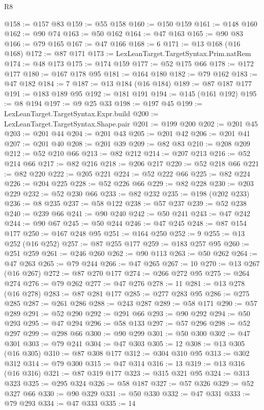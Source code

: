 \begin{lexlean}{R8}
\begin{coremodule}
@158 := @157 @83
@159 := @55 @158
@160 := @150 @159
@161 := @148 @160
@162 := @90 @74
@163 := @50 @162
@164 := @47 @163
@165 := @90 @83
@166 := @79 @165
@167 := @47 @166
@168 := 6
@171 := @13 @168 (@16 @168)
@172 := @87 @171
@173 := LexLeanTarget.TargetSyntax.Prim.natRem
@174 := @48 @173
@175 := @174 @159
@177 := @52 @175 @66
@178 := @172 @177
@180 := @167 @178 @95
@181 := @164 @180
@182 := @79 @162
@183 := @47 @182
@184 := 7
@187 := @13 @184 (@16 @184)
@189 := @87 @187 @177
@191 := @183 @189 @95
@192 := @181 @191
@194 := @145 (@161 @192)
@195 := @8 @194
@197 := @9 @25 @33
@198 := @197 @45
@199 := LexLeanTarget.TargetSyntax.Expr.build
@200 := LexLeanTarget.TargetSyntax.Shape.pair
@201 := @199 @200
@202 := @201 @45
@203 := @201 @44
@204 := @201 @43
@205 := @201 @42
@206 := @201 @41
@207 := @201 @40
@208 := @201 @39
@209 := @82 @83
@210 := @208 @209
@212 := @52 @210 @66
@213 := @82 @212
@214 := @207 @213
@216 := @52 @214 @66
@217 := @82 @216
@218 := @206 @217
@220 := @52 @218 @66
@221 := @82 @220
@222 := @205 @221
@224 := @52 @222 @66
@225 := @82 @224
@226 := @204 @225
@228 := @52 @226 @66
@229 := @82 @228
@230 := @203 @229
@232 := @52 @230 @66
@233 := @82 @232
@235 := @198 (@202 @233)
@236 := @8 @235
@237 := @58 @122
@238 := @57 @237
@239 := @52 @238
@240 := @239 @66
@241 := @90 @240
@242 := @50 @241
@243 := @47 @242
@244 := @90 @67
@245 := @50 @244
@246 := @47 @245
@248 := @87 @154 @177
@250 := @167 @248 @95
@251 := @164 @250
@252 := 9
@255 := @13 @252 (@16 @252)
@257 := @87 @255 @177
@259 := @183 @257 @95
@260 := @251 @259
@261 := @246 @260
@262 := @90 @113
@263 := @50 @262
@264 := @47 @263
@265 := @79 @244
@266 := @47 @265
@267 := 10
@270 := @13 @267 (@16 @267)
@272 := @87 @270 @177
@274 := @266 @272 @95
@275 := @264 @274
@276 := @79 @262
@277 := @47 @276
@278 := 11
@281 := @13 @278 (@16 @278)
@283 := @87 @281 @177
@285 := @277 @283 @95
@286 := @275 @285
@287 := @261 @286
@288 := @243 @287
@289 := @58 @171
@290 := @57 @289
@291 := @52 @290
@292 := @291 @66
@293 := @90 @292
@294 := @50 @293
@295 := @47 @294
@296 := @58 @133
@297 := @57 @296
@298 := @52 @297
@299 := @298 @66
@300 := @90 @299
@301 := @50 @300
@302 := @47 @301
@303 := @79 @241
@304 := @47 @303
@305 := 12
@308 := @13 @305 (@16 @305)
@310 := @87 @308 @177
@312 := @304 @310 @95
@313 := @302 @312
@314 := @79 @300
@315 := @47 @314
@316 := 13
@319 := @13 @316 (@16 @316)
@321 := @87 @319 @177
@323 := @315 @321 @95
@324 := @313 @323
@325 := @295 @324
@326 := @58 @187
@327 := @57 @326
@329 := @52 @327 @66
@330 := @90 @329
@331 := @50 @330
@332 := @47 @331
@333 := @79 @293
@334 := @47 @333
@335 := 14

\end{coremodule}
\end{lexlean}
